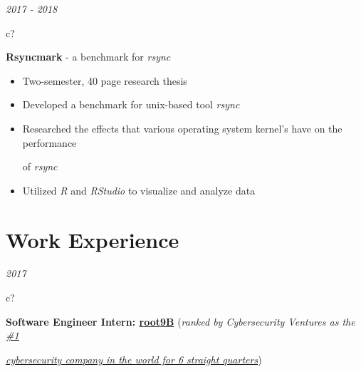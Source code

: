 \documentclass[12pt,a4paper,sans]{moderncv} %
\begin{document}
\textit{2017 - 2018}
\hspace{2 mm}
\begin{tabular}{c?}
 \\
\end{tabular}
 \hspace{2 mm} \textbf{Rsyncmark} - a benchmark for \textit{rsync} 
 
 \begin{itemize}
 \addtolength{\itemindent}{31.7 mm} 
 \item{Two-semester, 40 page research thesis }
 \item{Developed a benchmark for unix-based tool \textit{rsync}}
 \item Researched the effects that various operating system kernel's have on the performance 
 
  \hspace{30.5 mm} of \textit{rsync}
 \item{Utilized \textit{R} and \textit{RStudio} to visualize and analyze data}
 \end{itemize}
 
\vspace{-4 mm}
\section{Work Experience}

\hspace{11 mm}
\textit{2017}
\hspace{2 mm}
\begin{tabular}{c?}
 \\
\end{tabular}
 \hspace{2 mm}
 \textbf{Software Engineer Intern: \href{https://www.root9b.com/}{root9B}} (\textit{ranked by Cybersecurity Ventures as the \href{https://www.prnewswire.com/news-releases/root9b-remains-1-on-cybersecurity-500-for-6th-consecutive-quarter-300478860.html}{\underline{\#1}}}
 
\hspace{30 mm} \href{https://www.prnewswire.com/news-releases/root9b-remains-1-on-cybersecurity-500-for-6th-consecutive-quarter-300478860.html}{\textit{\underline{cybersecurity company in the world} for 6 straight quarters}})
\end{document}
